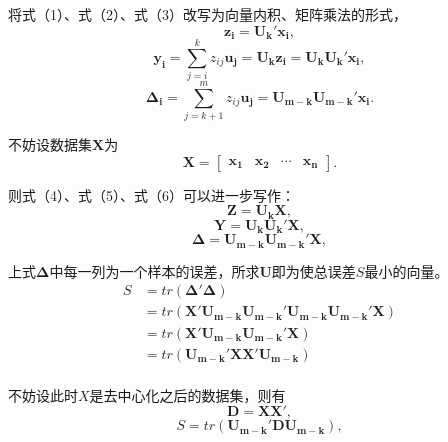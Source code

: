 \documentclass[withoutpreface,bwprint]{cumcmthesis}
\begin{document}
将式（1）、式（2）、式（3）改写为向量内积、矩阵乘法的形式，
\begin{equation}
\boldsymbol{z_{i}}=\boldsymbol{U_{k}'x_{i}},
\end{equation}
\begin{equation}
\boldsymbol{y_{i}}=\sum_{j=i}^{k}z_{ij}\boldsymbol{u_{j}}=\boldsymbol{U_{k}z_{i}}=\boldsymbol{U_{k}U_{k}'x_{i}},
\end{equation}
\begin{equation}
\boldsymbol{\Delta_{i}}=\sum_{j=k+1}^{m}z_{ij}\boldsymbol{u_{j}}=\boldsymbol{U_{m-k}U_{m-k}'x_{i}}.
\end{equation}

不妨设数据集$\boldsymbol{X}$为
\begin{equation*}
\boldsymbol{X}=\begin{bmatrix}\boldsymbol{x_{1}}&\boldsymbol{x_{2}}&\cdots&\boldsymbol{x_{n}}\end{bmatrix}.
\end{equation*}

则式（4）、式（5）、式（6）可以进一步写作：
\begin{equation*}
\boldsymbol{Z}=\boldsymbol{U_{k}X},
\end{equation*}
\begin{equation*}
\boldsymbol{Y}=\boldsymbol{U_{k}U_{k}'X},
\end{equation*}
\begin{equation*}
\boldsymbol{\Delta}=\boldsymbol{U_{m-k}U_{m-k}'X},
\end{equation*}

上式$\boldsymbol{\Delta}$中每一列为一个样本的误差，所求$\boldsymbol{U}$即为使总误差$S$最小的向量。
\begin{equation*}
\begin{aligned}
S&=tr(\boldsymbol{\Delta'\Delta})\\
&=tr(\boldsymbol{X'U_{m-k}U_{m-k}'U_{m-k}U_{m-k}'X})\\
&=tr(\boldsymbol{X'U_{m-k}U_{m-k}'X})\\
&=tr(\boldsymbol{U_{m-k}'XX'U_{m-k}})\\
\end{aligned}
\end{equation*}

不妨设此时$X$是去中心化之后的数据集，则有
\begin{equation*}
\boldsymbol{D}=\boldsymbol{XX'},
\end{equation*}
\begin{equation}
S=tr(\boldsymbol{U_{m-k}'DU_{m-k}}),
\end{equation}
\end{document}
